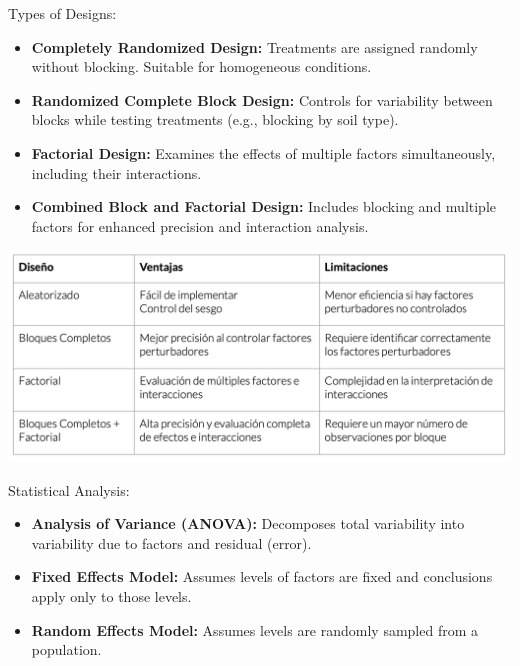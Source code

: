 \documentclass[10pt,landscape]{article}
\begin{document}
\begin{multicols}{3}
\vspace{-.8mm}
Types of Designs:
\vspace{-.9mm}
\begin{itemize}[label={--},leftmargin=3mm]
    \setlength{\itemsep}{-0.9mm}
    \item \textbf{Completely Randomized Design:} Treatments are assigned randomly without blocking. Suitable for homogeneous conditions.
    \item \textbf{Randomized Complete Block Design:} Controls for variability between blocks while testing treatments (e.g., blocking by soil type).
    \item \textbf{Factorial Design:} Examines the effects of multiple factors simultaneously, including their interactions.
    \item \textbf{Combined Block and Factorial Design:} Includes blocking and multiple factors for enhanced precision and interaction analysis.
\end{itemize}

\begin{center}
    \vspace{-1mm}
    \includegraphics[scale = .2]{images/doe_designs.png}
\end{center}
\vspace{-2mm}

\vspace{-.8mm}
Statistical Analysis:
\vspace{-.9mm}
\begin{itemize}[label={--},leftmargin=3mm]
    \setlength{\itemsep}{-0.7mm}
    \item \textbf{Analysis of Variance (ANOVA):} Decomposes total variability into variability due to factors and residual (error).
    \item \textbf{Fixed Effects Model:} Assumes levels of factors are fixed and conclusions apply only to those levels.
    \item \textbf{Random Effects Model:} Assumes levels are randomly sampled from a population.
\end{itemize}





\end{multicols}
\end{document}
